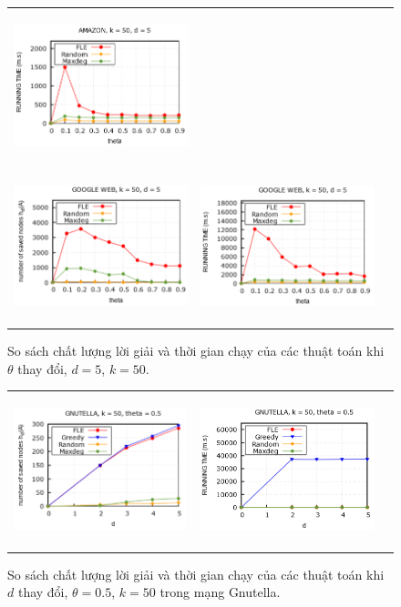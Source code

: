 \begin{figure}
\begin{tabular}{lll}
		\includegraphics[height = 4.4cm]{picture/FLE/amazon_time_theta} 
		\\
		\includegraphics[height = 4.4cm]{picture/FLE/google_res_theta} &
		\includegraphics[height = 4.4cm]{picture/FLE/google_time_theta} 
	\end{tabular}
	\caption{So sách chất lượng lời giải và thời gian chạy của các thuật toán khi $\theta$ thay đổi, $d=5$, $k=50$.} 
	\label{fig:FLE_theta}   
\end{figure} 

\begin{figure}
	\begin{tabular}{lll}
		\includegraphics[height = 4.4cm]{picture/FLE/gnu_res_d} &
		\includegraphics[height = 4.4cm]{picture/FLE/gnu_time_d}
	\end{tabular}
	\caption{So sách chất lượng lời giải và thời gian chạy của các thuật toán khi $d$ thay đổi, $\theta=0.5$, $k=50$ trong mạng Gnutella.} 
	\label{fig:FLE_d}   
\end{figure} 

